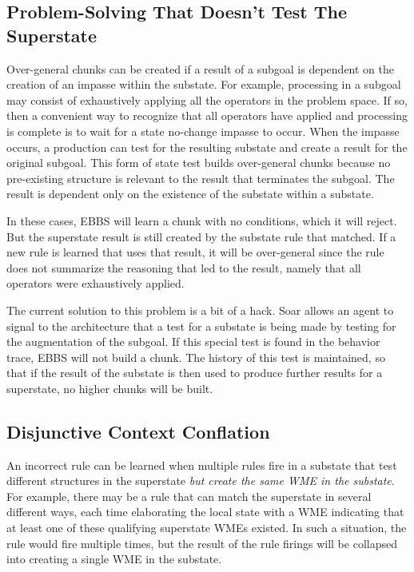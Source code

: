 \subsection{Problem-Solving That Doesn't Test The Superstate}
\label{CHUNKING-subtleties-exhaustion}

Over-general chunks can be created if a result of a subgoal is dependent on the creation of an impasse within the substate. For example, processing in a subgoal may consist of exhaustively applying all the operators in the problem space. If so, then a convenient way to recognize that all operators have applied and processing is complete is to wait for a state no-change impasse to occur. When the impasse occurs, a production can test for the resulting substate and create a result for the original subgoal. This form of state test builds over-general chunks because no pre-existing structure is relevant to the result that terminates the subgoal. The result is dependent only on the existence of the substate within a substate.

In these cases, EBBS will learn a chunk with no conditions, which it will reject.  But the superstate result is still created by the substate rule that matched.  If a new rule is learned that uses that result, it will be over-general since the rule does not summarize the reasoning that led to the result, namely that all operators were exhaustively applied.

The current solution to this problem is a bit of a hack.  Soar allows an agent to signal to the architecture that a test for a substate is being made by testing for the  augmentation of the subgoal. If this special test is found in the behavior trace, EBBS will not build a chunk. The history of this test is maintained, so that if the result of the substate is then used to produce further results for a superstate, no higher chunks will be built.

\subsection{Disjunctive Context Conflation}
\label{CHUNKING-subtleties-disjunctive}

An incorrect rule can be learned when multiple rules fire in a substate that test different structures in the superstate \emph{but create the same WME in the substate}. For example, there may be a rule that can match the superstate in several different ways, each time elaborating the local state with a WME indicating that at least one of these qualifying superstate WMEs existed. In such a situation, the rule would fire multiple times, but the result of the rule firings will be collapsed into creating a single WME in the substate.

